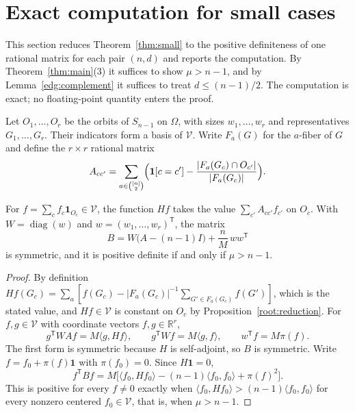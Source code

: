 \section{Exact computation for small cases}\label{cert:section}
This section reduces Theorem~\ref{thm:small} to the positive definiteness of
one rational matrix for each pair $(n,d)$ and reports the computation. By
Theorem~\ref{thm:main}(3) it suffices to show $\mu>n-1$, and by
Lemma~\ref{edg:complement} it suffices to treat $d\le(n-1)/2$. The
computation is exact; no floating-point quantity enters the proof.

Let $O_1,\ldots,O_r$ be the orbits of $S_{n-1}$ on $\Omega$, with sizes
$w_1,\ldots,w_r$ and representatives $G_1,\ldots,G_r$. Their indicators form
a basis of $\mathcal V$. Write $F_a(G)$ for the $a$-fiber of $G$ and define
the $r\times r$ rational matrix
\begin{equation}\label{cert:matrix}
 A_{cc'}=\sum_{a\in\binom{[n]}2}
 \Bigl(\mathbf1[c=c']-\frac{|F_a(G_c)\cap O_{c'}|}{|F_a(G_c)|}\Bigr).
\end{equation}

\begin{lemma}\label{cert:criterion}
For $f=\sum_cf_c\mathbf1_{O_c}\in\mathcal V$, the function $Hf$ takes the
value $\sum_{c'}A_{cc'}f_{c'}$ on $O_c$. With $W=\operatorname{diag}(w)$ and
$w=(w_1,\ldots,w_r)^{\mathsf T}$, the matrix
\begin{equation}\label{cert:B}
 B=W\bigl(A-(n-1)I\bigr)+\frac nM\,ww^{\mathsf T}
\end{equation}
is symmetric, and it is positive definite if and only if $\mu>n-1$.
\end{lemma}

\begin{proof}
By definition $Hf(G_c)=\sum_a[f(G_c)-|F_a(G_c)|^{-1}\sum_{G'\in F_a(G_c)}f(G')]$,
which is the stated value, and $Hf\in\mathcal V$ is constant on $O_c$ by
Proposition~\ref{root:reduction}. For $f,g\in\mathcal V$ with coordinate
vectors $f,g\in\mathbb R^r$,
\[
 g^{\mathsf T}WAf=M\langle g,Hf\rangle,\qquad
 g^{\mathsf T}Wf=M\langle g,f\rangle,\qquad w^{\mathsf T}f=M\pi(f).
\]
The first form is symmetric because $H$ is self-adjoint, so $B$ is
symmetric. Write $f=f_0+\pi(f)\mathbf1$ with $\pi(f_0)=0$. Since
$H\mathbf1=0$,
\[
 f^{\mathsf T}Bf
 =M\bigl[\langle f_0,Hf_0\rangle-(n-1)\langle f_0,f_0\rangle+\pi(f)^2\bigr].
\]
This is positive for every $f\ne0$ exactly when
$\langle f_0,Hf_0\rangle>(n-1)\langle f_0,f_0\rangle$ for every nonzero
centered $f_0\in\mathcal V$, that is, when $\mu>n-1$.
\end{proof}

